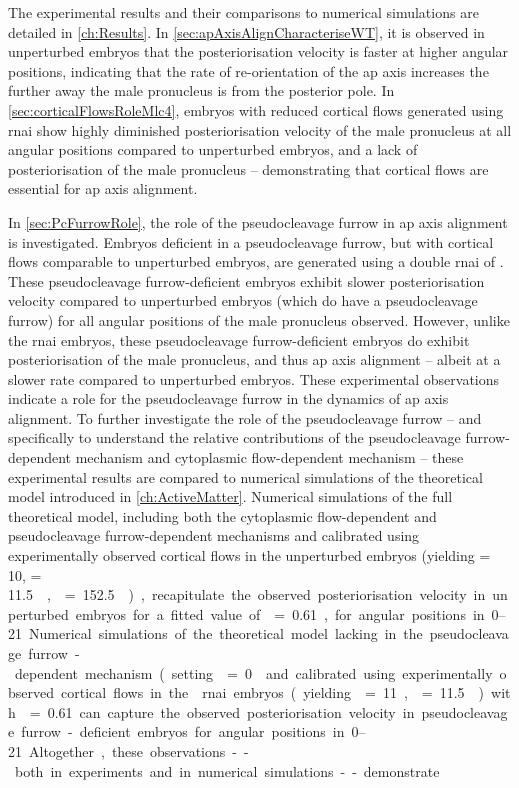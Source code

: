 The experimental results and their comparisons to numerical simulations are detailed in \autoref{ch:Results}. In \autoref{sec:apAxisAlignCharacteriseWT}, it is observed in unperturbed embryos that the posteriorisation velocity is faster at higher angular positions, indicating that the rate of re-orientation of the \ac{ap} axis increases the further away the male pronucleus is from the posterior pole. In \autoref{sec:corticalFlowsRoleMlc4}, embryos with reduced cortical flows generated using  \ac{rnai} show highly diminished posteriorisation velocity of the male pronucleus at all angular positions compared to unperturbed embryos, and a lack of posteriorisation of the male pronucleus -- demonstrating that cortical flows are essential for \ac{ap} axis alignment. 

In \autoref{sec:PcFurrowRole}, the role of the pseudocleavage furrow in \ac{ap} axis alignment is investigated. Embryos deficient in a pseudocleavage furrow, but with cortical flows comparable to unperturbed embryos, are generated using a double \ac{rnai} of . These pseudocleavage furrow-deficient embryos exhibit slower posteriorisation velocity compared to unperturbed embryos (which do have a pseudocleavage furrow) for all angular positions of the male pronucleus observed. However, unlike the  \ac{rnai} embryos, these pseudocleavage furrow-deficient embryos do exhibit posteriorisation of the male pronucleus, and thus \ac{ap} axis alignment -- albeit at a slower rate compared to unperturbed embryos. These experimental observations indicate a role for the pseudocleavage furrow in the dynamics of \ac{ap} axis alignment. To further investigate the role of the pseudocleavage furrow -- and specifically to understand the relative contributions of the pseudocleavage furrow-dependent mechanism and cytoplasmic flow-dependent mechanism -- these experimental results are compared to numerical simulations of the theoretical model introduced in \autoref{ch:ActiveMatter}. Numerical simulations of the full theoretical model, including both the cytoplasmic flow-dependent and pseudocleavage furrow-dependent mechanisms and calibrated using experimentally observed cortical flows in the unperturbed embryos (yielding \hydrodynamicLength = \SI{10}{\unitLength}, \activeRelaxLength = \SI{11.5}{\square\unitLength\per\second}, \nematicLength = \SI{152.5}{\square\unitLength\per\second}), recapitulate the observed posteriorisation velocity in unperturbed embryos for a fitted value of \dragCoefficient = \num{0.61}, for angular positions in \SIrange{0}{21}{\unitAngle}. Numerical simulations of the theoretical model lacking in the pseudocleavage furrow-dependent mechanism (setting \nematicLength = \SI{0}{\square\unitLength\per\second} and calibrated using experimentally observed cortical flows in the  \ac{rnai} embryos (yielding \hydrodynamicLength = \SI{11}{\unitLength}, \activeRelaxLength = \SI{11.5}{\square\unitLength\per\second}) with \dragCoefficient = \num{0.61} can capture the observed posteriorisation velocity in pseudocleavage furrow-deficient embryos for angular positions in \SIrange{0}{21}{\unitAngle}. Altogether, these observations -- both in experiments and in numerical simulations -- demonstrate 
